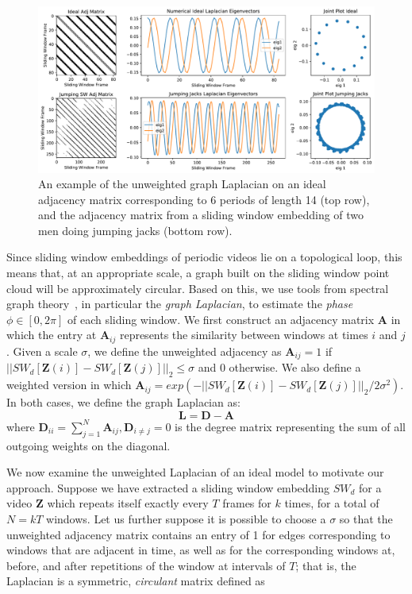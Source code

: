 \documentclass{article}
\newcommand{\mb}{\mathbf}
\begin{document}
\begin{figure}
\centering
\includegraphics[width=\columnwidth]{CirculantExample.pdf}
\caption{An example of the unweighted graph Laplacian on an ideal adjacency matrix corresponding to 6 periods of length 14 (top row), and the adjacency matrix from a sliding window embedding of two men doing jumping jacks (bottom row).  }
\label{fig:CirculantExample}
\end{figure}

Since sliding window embeddings of periodic videos lie on a topological loop, this means that, at an appropriate scale, a graph built on the sliding window point cloud will be approximately circular.  Based on this, we use tools from spectral graph theory~\cite{chung1997spectral}, in particular the {\em graph Laplacian}, to estimate the {\em phase} $\phi \in [0, 2 \pi]$ of each sliding window. We first construct an adjacency matrix $\mb{A}$ in which the entry at $\mb{A}_{ij}$ represents the similarity between windows at times $i$ and $j$.  Given a scale $\sigma$, we define the unweighted adjacency as $\mb{A}_{ij} = 1$ if $||SW_{d}[\mb{Z}(i)] - SW_{d}[\mb{Z}(j)]||_2 \leq \sigma$ and 0 otherwise. We also define a weighted version in which $\mb{A}_{ij} = exp(-||SW_{d}[\mb{Z}(i)] - SW_{d}[\mb{Z}(j)]||_2/2\sigma^2)$. In both cases, we define the graph Laplacian as:
\begin{equation}
	\mb{L} = \mb{D}-\mb{A}
\end{equation}
where $\mb{D}_{ii} = \sum_{j = 1}^N \mb{A}_{ij}, \mb{D}_{i \neq j} = 0$ is the degree matrix representing the sum of all outgoing weights on the diagonal.  

We now examine the unweighted Laplacian of an ideal model to motivate our approach.  Suppose we have extracted a sliding window embedding $SW_{d}$ for a video $\mb{Z}$ which repeats itself exactly every $T$ frames for $k$ times, for a total of $N = kT$ windows.  Let us further suppose it is possible to choose a $\sigma$ so that the unweighted adjacency matrix contains an entry of 1 for edges corresponding to windows that are adjacent in time, as well as for the corresponding windows at, before, and after repetitions of the window at intervals of $T$; that is, the Laplacian is a symmetric, {\em circulant} matrix defined as
\end{document}
